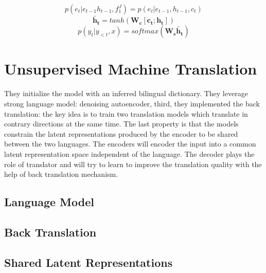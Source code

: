 \[ p(e_t|e_{t-1} h_{t-1}, f_1^J) =  p(e_t| e_{t-1}, h_{t-1}, c_t)\]
\[ \bm{\tilde{h_{t}}} = tanh(\bm{W_{c}[c_t; h_t]}) \]
\[p(y_t| y_{<t}, x) = softmax(\bm{W_s \tilde{h_t}})\]


\section{Unsupervised Machine Translation}
They initialize the model with an inferred bilingual dictionary. They leverage strong language model: denoising autoencoder,  third, they implemented the back translation: the key idea is to train two translation models which translate in contrary directions at the same time. The last property is that the models constrain the latent representations produced by the encoder to be shared between the two languages. The encoders will encoder the input into a common latent representation space independent of the language. The decoder plays the role of translator and will try to learn to improve the translation quality with the help of back translation mechanism.

\subsection{Language Model}

\subsection{Back Translation}

\subsection{Shared Latent Representations}





































